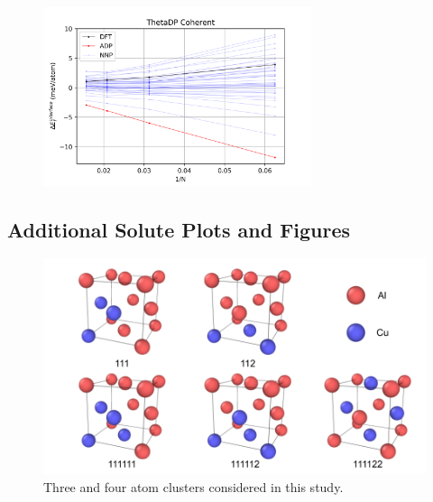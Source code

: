 \documentclass{article}
\begin{document}
\begin{figure}[H]%
\centering%
\includegraphics[width=0.7\textwidth,center]{figures/InterfaceSlope_ThetaDP_Coherent.png}%
\end{figure}


\subsection{Additional Solute Plots and Figures} \label{apd_sct:adn_solsol}

\begin{figure}[H]%
\centering%
\includegraphics[width=1\textwidth,center]{figures/ClusterPlot-Daniel-2020.04.15.png}%
\caption{Three and four atom clusters considered in this study.}%
\label{fig:atomview_clusters}
\end{figure}
\end{document}

